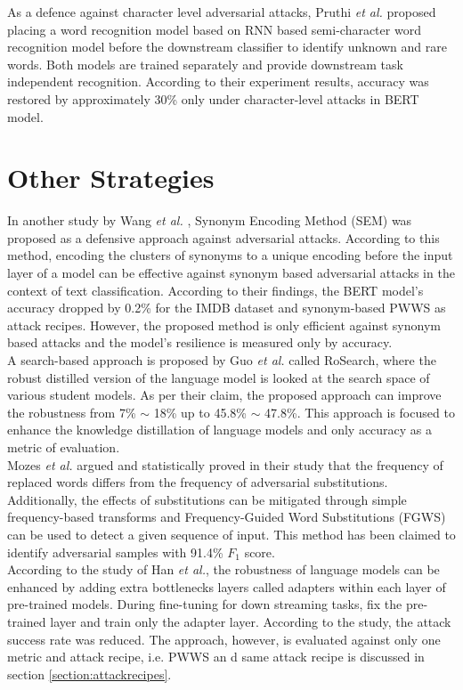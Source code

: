 \documentclass[%
	BCOR=8mm, %
	DIV=12,
	toc=bibliography, %
	toc=listof, %
	oneside, %
	egregdoesnotlikesansseriftitles, %
	]{scrbook}
\begin{document}
As a defence against character level adversarial attacks, Pruthi \textit{et al.} \cite{pruthi_combating_2019} proposed placing a word recognition model based on RNN based semi-character word recognition model before the downstream classifier to identify unknown and rare words. Both models are trained separately and provide downstream task independent recognition. According to their experiment results, accuracy was restored by approximately 30\% only under character-level attacks in BERT model. 
\section{Other Strategies}
In another study by Wang \textit{et al.} \cite{wang_natural_2020-1}, Synonym Encoding Method (SEM) was proposed as a defensive approach against adversarial attacks. According to this method,  encoding the clusters of synonyms to a unique encoding before the input layer of a model can be effective against synonym based adversarial attacks in the context of text classification. According to their findings, the BERT model's accuracy dropped by 0.2\% for the IMDB dataset and synonym-based PWWS as attack recipes. However, the proposed method is only efficient against synonym based attacks and the model's resilience is measured only by accuracy.\\
A search-based approach is proposed by Guo \textit{et al.} \cite{guo_rosearch_2021} called RoSearch, where the robust distilled version of the language model is looked at the search space of various student models. As per their claim, the proposed approach can improve the robustness from 7\% $\sim$ 18\% up to 45.8\% $\sim$ 47.8\%. This approach is focused to enhance the knowledge distillation of language models and only accuracy as a metric of evaluation.\\
Mozes \textit{et al.} \cite{mozes_frequency-guided_2021} argued and statistically proved in their study that the frequency of replaced words differs from the frequency of adversarial substitutions. Additionally, the effects of substitutions can be mitigated through simple frequency-based transforms and Frequency-Guided Word Substitutions (FGWS) can be used to detect a given sequence of input. This method has been claimed to identify adversarial samples with 91.4\% $F_{1}$ score.\\
According to the study of Han \textit{et al.}\cite{han_robust_2021}, the robustness of language models can be enhanced by adding extra bottlenecks layers called adapters within each layer of pre-trained models. During fine-tuning for down streaming tasks, fix the pre-trained layer and train only the adapter layer. According to the study, the attack success rate was reduced. The approach, however, is evaluated against only one metric and attack recipe, i.e. PWWS \cite{ren_generating_2019} an d same attack recipe is discussed in section \ref{section:attackrecipes}.\\
\end{document}
